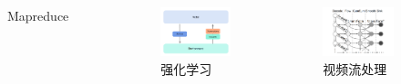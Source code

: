 \begin{frame}
\begin{columns}[onlytextwidth]
\begin{figure}
			\caption{Mapreduce}
		\end{figure}
		\begin{figure}
			\centering
			\includegraphics[width=\textwidth]{image/chap01/acme.png}	
			\caption{强化学习}
		\end{figure}
		\begin{figure}
			\centering
			\includegraphics[width=\textwidth]{image/chap01/ray.png}
			\caption{视频流处理}
		\end{figure}
	\end{columns}
\end{frame}

